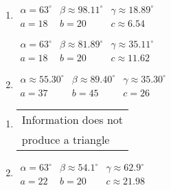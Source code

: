 \begin{multicols}{2}

\begin{enumerate}

\setcounter{enumi}{\value{HW}}

\item $\begin{array}{lll}
\alpha = 63^{\circ} & \beta \approx 98.11^{\circ} & \gamma \approx 18.89^{\circ} \\
a = 18 & b = 20 & c \approx 6.54 \end{array}$

$\begin{array}{lll}
\alpha = 63^{\circ} & \beta \approx 81.89^{\circ} & \gamma \approx 35.11^{\circ} \\
a = 18 & b = 20 & c \approx 11.62 \end{array}$

\item $\begin{array}{lll}
\alpha \approx 55.30^{\circ} & \beta \approx 89.40^{\circ} & \gamma \approx 35.30^{\circ} \\
a = 37 & b = 45 & c = 26 \end{array}$

\setcounter{HW}{\value{enumi}}

\end{enumerate}

\end{multicols}

\begin{multicols}{2} 

\begin{enumerate}

\setcounter{enumi}{\value{HW}}

\item \begin{tabular}{l}
Information does not \\
produce a triangle \end{tabular}

\item $\begin{array}{lll}
\alpha = 63^{\circ} & \beta \approx 54.1^{\circ} & \gamma \approx 62.9^{\circ} \\
a = 22 & b = 20 & c \approx 21.98 \end{array}$

\setcounter{HW}{\value{enumi}}

\end{enumerate}

\end{multicols}

